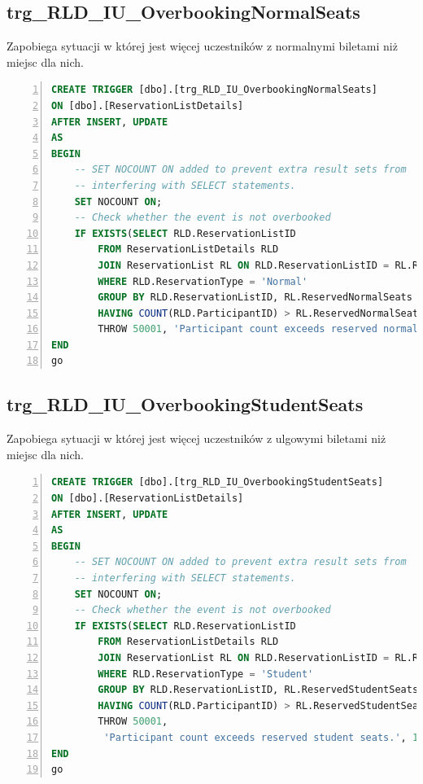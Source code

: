 \documentclass[]{article}
\begin{document}
	\subsection{trg\_RLD\_IU\_OverbookingNormalSeats}
Zapobiega sytuacji w której jest więcej uczestników z normalnymi biletami niż miejsc dla nich.
\begin{lstlisting}[language=SQL,
showspaces=false,
basicstyle=\ttfamily,
numbers=left,
numberstyle=\tiny,
tabsize=2,
backgroundcolor=\color{lightg},
keywordstyle=\color{lightblue},
commentstyle=\color{gray}]
CREATE TRIGGER [dbo].[trg_RLD_IU_OverbookingNormalSeats]
ON [dbo].[ReservationListDetails]
AFTER INSERT, UPDATE
AS
BEGIN
	-- SET NOCOUNT ON added to prevent extra result sets from
	-- interfering with SELECT statements.
	SET NOCOUNT ON;
	-- Check whether the event is not overbooked
	IF EXISTS(SELECT RLD.ReservationListID
		FROM ReservationListDetails RLD
		JOIN ReservationList RL ON RLD.ReservationListID = RL.ReservationListID
		WHERE RLD.ReservationType = 'Normal'
		GROUP BY RLD.ReservationListID, RL.ReservedNormalSeats
		HAVING COUNT(RLD.ParticipantID) > RL.ReservedNormalSeats)
		THROW 50001, 'Participant count exceeds reserved normal seats.', 1
END
go
\end{lstlisting}

	\subsection{trg\_RLD\_IU\_OverbookingStudentSeats}
Zapobiega sytuacji w której jest więcej uczestników z ulgowymi biletami niż miejsc dla nich.
\begin{lstlisting}[language=SQL,
showspaces=false,
basicstyle=\ttfamily,
numbers=left,
numberstyle=\tiny,
tabsize=2,
backgroundcolor=\color{lightg},
keywordstyle=\color{lightblue},
commentstyle=\color{gray}]
CREATE TRIGGER [dbo].[trg_RLD_IU_OverbookingStudentSeats]
ON [dbo].[ReservationListDetails]
AFTER INSERT, UPDATE
AS
BEGIN
	-- SET NOCOUNT ON added to prevent extra result sets from
	-- interfering with SELECT statements.
	SET NOCOUNT ON;
	-- Check whether the event is not overbooked
	IF EXISTS(SELECT RLD.ReservationListID
		FROM ReservationListDetails RLD
		JOIN ReservationList RL ON RLD.ReservationListID = RL.ReservationListID
		WHERE RLD.ReservationType = 'Student'
		GROUP BY RLD.ReservationListID, RL.ReservedStudentSeats
		HAVING COUNT(RLD.ParticipantID) > RL.ReservedStudentSeats)
		THROW 50001,
		 'Participant count exceeds reserved student seats.', 1
END
go
\end{lstlisting}
\end{document}

